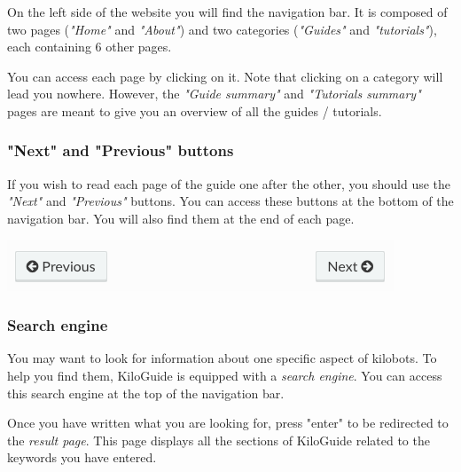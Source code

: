 \documentclass[a4paper,12pt,titlepage]{scrartcl}
\begin{document}
On the left side of the website you will find the navigation bar. It is composed of two pages (\emph{"Home"} and \emph{"About"}) and two categories (\emph{"Guides"} and \emph{"tutorials"}), each containing 6 other pages.

You can access each page by clicking on it. Note that clicking on a category will lead you nowhere. However, the \emph{"Guide summary"} and \emph{"Tutorials summary"} pages are meant to give you an overview of all the guides / tutorials.

\subsubsection{"Next" and "Previous" buttons}

If you wish to read each page of the guide one after the other, you should use the \emph{"Next"} and \emph{"Previous"} buttons. You can access these buttons at the bottom of the navigation bar. You will also find them at the end of each page.

\begin{center}
\includegraphics[scale=0.6]{previous&next.png}
\end{center}

\subsubsection{Search engine}

You may want to look for information about one specific aspect of kilobots. To help you find them, KiloGuide is equipped with a \emph{search engine}. You can access this search engine at the top of the navigation bar.

Once you have written what you are looking for, press "enter" to be redirected to the \emph{result page}. This page displays all the sections of KiloGuide related to the keywords you have entered. 
\end{document}

